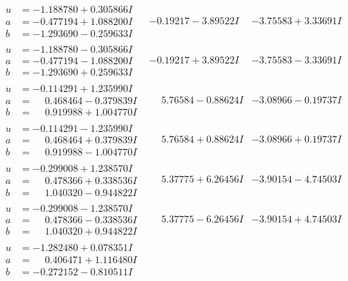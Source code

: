 \documentclass[1p]{elsarticle_modified}
\theoremstyle{definition}
\begin{document}
$$\begin{array}{c|c|c}
\begin{aligned}
u &= -1.188780 + 0.305866 I \\
a &= -0.477194 + 1.088200 I \\
b &= -1.293690 - 0.259633 I\end{aligned}
 & -0.19217 - 3.89522 I & -3.75583 + 3.33691 I \\ \hline\begin{aligned}
u &= -1.188780 - 0.305866 I \\
a &= -0.477194 - 1.088200 I \\
b &= -1.293690 + 0.259633 I\end{aligned}
 & -0.19217 + 3.89522 I & -3.75583 - 3.33691 I \\ \hline\begin{aligned}
u &= -0.114291 + 1.235990 I \\
a &= \phantom{-}0.468464 - 0.379839 I \\
b &= \phantom{-}0.919988 + 1.004770 I\end{aligned}
 & \phantom{-}5.76584 - 0.88624 I & -3.08966 - 0.19737 I \\ \hline\begin{aligned}
u &= -0.114291 - 1.235990 I \\
a &= \phantom{-}0.468464 + 0.379839 I \\
b &= \phantom{-}0.919988 - 1.004770 I\end{aligned}
 & \phantom{-}5.76584 + 0.88624 I & -3.08966 + 0.19737 I \\ \hline\begin{aligned}
u &= -0.299008 + 1.238570 I \\
a &= \phantom{-}0.478366 + 0.338536 I \\
b &= \phantom{-}1.040320 - 0.944822 I\end{aligned}
 & \phantom{-}5.37775 + 6.26456 I & -3.90154 - 4.74503 I \\ \hline\begin{aligned}
u &= -0.299008 - 1.238570 I \\
a &= \phantom{-}0.478366 - 0.338536 I \\
b &= \phantom{-}1.040320 + 0.944822 I\end{aligned}
 & \phantom{-}5.37775 - 6.26456 I & -3.90154 + 4.74503 I \\ \hline\begin{aligned}
u &= -1.282480 + 0.078351 I \\
a &= \phantom{-}0.406471 + 1.116480 I \\
b &= -0.272152 - 0.810511 I\end{aligned}

\end{array}$$
\end{document}
